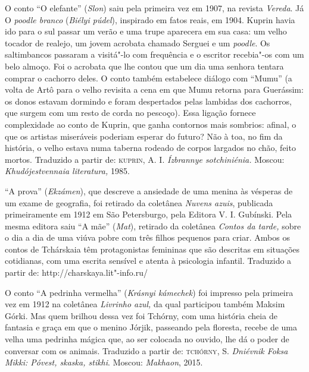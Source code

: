 \medskip

O conto ``O elefante'' (\emph{Slon}) saiu pela primeira vez em 1907,
na revista \emph{Vereda}. Já O \emph{poodle branco} (\emph{Biélyi
púdel}), inspirado em fatos reais, em 1904. Kuprin havia ido para o sul
passar um verão e uma trupe aparecera em sua casa: um velho tocador de
realejo, um jovem acrobata chamado Serguei e um \emph{poodle}. Os
saltimbancos passaram a visitá"-lo com frequência e o escritor recebia"-os
com um belo almoço. Foi o acrobata que lhe contou que um dia uma senhora
tentara comprar o cachorro deles. O conto também estabelece diálogo com
``Mumu'' (a volta de Artô para o velho revisita a cena em que Mumu
retorna para Guerássim: os donos estavam dormindo e foram despertados
pelas lambidas dos cachorros, que surgem com um resto de corda no
pescoço). Essa ligação fornece complexidade ao conto de Kuprin, que
ganha contornos mais sombrios: afinal, o que os artistas miseráveis
poderiam esperar do futuro? Não à toa, no fim da história, o velho
estava numa taberna rodeado de corpos largados no chão, feito mortos.
Traduzido a partir de:
\textsc{kuprin}, A. I. \emph{Ízbrannye sotchiniénia.} Moscou:
\emph{Khudójestvennaia literatura,} 1985.

\medskip

``A prova'' (\emph{Ekzámen}), que descreve a ansiedade de uma
menina às vésperas de um exame de geografia, foi retirado da coletânea
\emph{Nuvens azuis}, publicada primeiramente em 1912 em São Petersburgo,
pela Editora V. I. Gubínski. Pela mesma editora saiu ``A mãe''
(\emph{Mat}), retirado da coletânea \emph{Contos da tarde,} sobre o dia
a dia de uma viúva pobre com três filhos pequenos para criar. Ambos os
contos de Tchárskaia têm protagonistas femininas que são descritas em situações
cotidianas, com uma escrita sensível e atenta à psicologia infantil.
Traduzido a partir de: http://charskaya.lit"-info.ru/

\medskip

O conto ``A pedrinha vermelha'' (\emph{Krásnyi kámechek}) foi impresso
pela primeira vez em 1912 na coletânea \emph{Livrinho azul,} da qual
participou também Maksim Górki. Mas quem brilhou dessa vez foi Tchórny,
com uma história cheia de fantasia e graça em que o menino Jórjik,
passeando pela floresta, recebe de uma velha uma pedrinha mágica que, ao
ser colocada no ouvido, lhe dá o poder de conversar com os animais.
Traduzido a partir de:
\textsc{tchórny}, S. \emph{Dniévnik Foksa Mikki: Póvest, skaska, stikhi}. Moscou:
\emph{Makhaon}, 2015.

